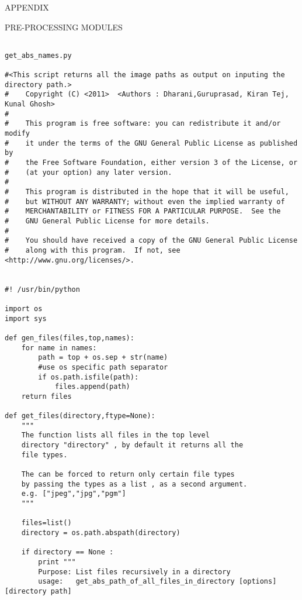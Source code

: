 \documentclass[10pt,a4paper]{article}
\begin{document}
\begin{center}\textup{\Large APPENDIX }\\[1.0cm] 
\end{center}
\begin{flushleft}

\textup{\Large PRE-PROCESSING MODULES} \\[0.5cm]


\end{flushleft}

\begin{lstlisting}

get_abs_names.py

#<This script returns all the image paths as output on inputing the directory path.>
#    Copyright (C) <2011>  <Authors : Dharani,Guruprasad, Kiran Tej, Kunal Ghosh>
#
#    This program is free software: you can redistribute it and/or modify
#    it under the terms of the GNU General Public License as published by
#    the Free Software Foundation, either version 3 of the License, or
#    (at your option) any later version.
#
#    This program is distributed in the hope that it will be useful,
#    but WITHOUT ANY WARRANTY; without even the implied warranty of
#    MERCHANTABILITY or FITNESS FOR A PARTICULAR PURPOSE.  See the
#    GNU General Public License for more details.
#
#    You should have received a copy of the GNU General Public License
#    along with this program.  If not, see <http://www.gnu.org/licenses/>.


#! /usr/bin/python

import os
import sys

def gen_files(files,top,names):
    for name in names:
        path = top + os.sep + str(name)
        #use os specific path separator
        if os.path.isfile(path):
            files.append(path)
    return files

def get_files(directory,ftype=None):
    """
    The function lists all files in the top level
    directory "directory" , by default it returns all the
    file types.

    The can be forced to return only certain file types
    by passing the types as a list , as a second argument.
    e.g. ["jpeg","jpg","pgm"] 
    """

    files=list()
    directory = os.path.abspath(directory)
    
    if directory == None :
        print """
        Purpose: List files recursively in a directory
        usage:   get_abs_path_of_all_files_in_directory [options] [directory path]


\end{lstlisting}
\end{document}
